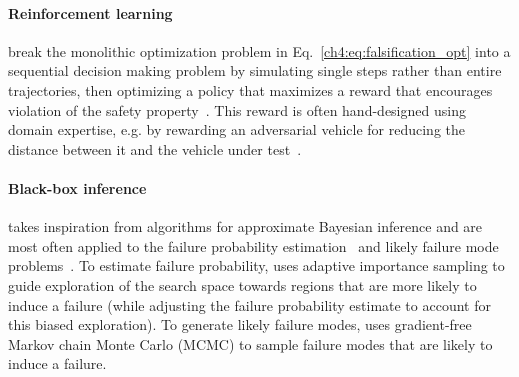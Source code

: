 \paragraph{Reinforcement learning} break the monolithic optimization problem in Eq.~\eqref{ch4:eq:falsification_opt} into a sequential decision making problem by simulating single steps rather than entire trajectories, then optimizing a policy that maximizes a reward that encourages violation of the safety property~\cite{corsoAdaptiveStressTesting2019}. This reward is often hand-designed using domain expertise, e.g. by rewarding an adversarial vehicle for reducing the distance between it and the vehicle under test~\cite{dingLearningCollideAdaptive2020a}.

\paragraph{Black-box inference} takes inspiration from algorithms for approximate Bayesian inference and are most often applied to the failure probability estimation~\cite{okellyScalableEndtoEndAutonomous2018a} and likely failure mode problems~\cite{zhouRoCUSRobotController2021}. To estimate failure probability, \cite{okellyScalableEndtoEndAutonomous2018a} uses adaptive importance sampling to guide exploration of the search space towards regions that are more likely to induce a failure (while adjusting the failure probability estimate to account for this biased exploration). To generate likely failure modes, \cite{zhouRoCUSRobotController2021} uses gradient-free Markov chain Monte Carlo (MCMC) to sample failure modes that are likely to induce a failure.



